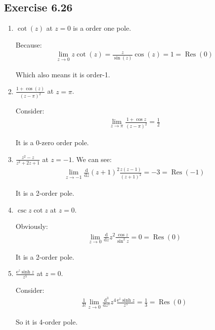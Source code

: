 \documentclass[]{ctexart}
\newcommand{\di}{\mathrm{d}}
\newcommand{\me}{\mathrm{e}}
\begin{document}
		\subsection{Exercise 6.26}
			\begin{enumerate}
				\item $\cot(z)$ at $z=0$ is a order one pole.
				
				 Because: 
					\begin{equation*}
					\begin{aligned}
						\lim_{z\to 0}z\cot (z)=\frac{z}{\sin(z)}\cos(z)=1=\operatorname{Res}(0)
					\end{aligned}
					\end{equation*}
				
				Which also means it is order-1.
				\item $\frac{1+\cos(z)}{(z-\pi)^2}$ at $z=\pi$. 
				
				Consider:
					\begin{equation*}
					\begin{aligned}
						\lim_{z\to \pi}\frac{1+\cos z}{(z-\pi)^2}=\frac{1}{2}
					\end{aligned}
					\end{equation*}
					
				It is a 0-zero order pole. 
				\item $\frac{z^2-z}{z^2+2z+1}$ at $z=-1$.
				We can see:
					\begin{equation*}
					\begin{aligned}
						\lim_{z\to -1}\frac{\di }{\di z}(z+1)^2\frac{z(z-1)}{(z+1)^2}=-3=\operatorname{Res}(-1)
					\end{aligned}
					\end{equation*}
					
				It is a 2-order pole. 
				\item $\csc z\cot z$ at $z=0$. 
				
				Obviously:
					\begin{equation*}
					\begin{aligned}
						\lim_{z\to 0}\frac{\di }{\di z}z^2\frac{\cos z}{\sin^2 z }=0=\operatorname{Res}(0)
					\end{aligned}
					\end{equation*}
					
				It is a 2-order pole. 
				\item $\frac{\me ^{z}\sinh z}{z^5}$ at $z=0$.
				
				Consider:
					\begin{equation*}
					\begin{aligned}
						\frac{1}{3!}\lim_{z\to 0}\frac{\di ^3}{\di z^3}z^4\frac{\me ^{z}\sinh z}{z^5}=\frac{1}{3}=\operatorname{Res}(0)
					\end{aligned}
					\end{equation*}
					
				So it is 4-order pole. 
			\end{enumerate}
		
\end{document}
